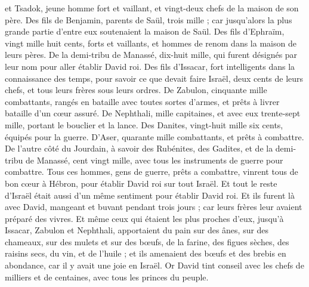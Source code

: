 \begin{multicols}{2}
et Tsadok, jeune homme fort et vaillant, et vingt-deux chefs de la maison de son père.
Des fils de Benjamin, parents de Saül, trois mille ; car jusqu'alors la plus grande partie d’entre eux soutenaient la maison de Saül.
Des fils d'Ephraïm, vingt mille huit cents, forts et vaillants, et hommes de renom dans la maison de leurs pères.
De la demi-tribu de Manassé, dix-huit mille, qui furent désignés par leur nom pour aller établir David roi.
Des fils d'Issacar, fort intelligents dans la connaissance des temps, pour savoir ce que devait faire Israël, deux cents de leurs chefs, et tous leurs frères sous leurs ordres.
De Zabulon, cinquante mille combattants, rangés en bataille avec toutes sortes d'armes, et prêts à livrer bataille d’un cœur assuré.
De Nephthali, mille capitaines, et avec eux trente-sept mille, portant le bouclier et la lance.
Des Danites, vingt-huit mille six cents, équipés pour la guerre.
D'Aser, quarante mille combattants, et prêts à combattre.
De l’autre côté du Jourdain, à savoir des Rubénites, des Gadites, et de la demi-tribu de Manassé, cent vingt mille, avec tous les instruments de guerre pour combattre.
Tous ces hommes, gens de guerre, prêts a combattre, vinrent tous de bon cœur à Hébron, pour établir David roi sur tout Israël. Et tout le reste d'Israël était aussi d'un même sentiment pour établir David roi.
Et ils furent là avec David, mangeant et buvant pendant trois jours ; car leurs frères leur avaient préparé des vivres.
Et même ceux qui étaient les plus proches d'eux, jusqu'à Issacar, Zabulon et Nephthali, apportaient du pain sur des ânes, sur des chameaux, sur des mulets et sur des bœufs, de la farine, des figues sèches, des raisins secs, du vin, et de l'huile ; et ils amenaient des bœufs et des brebis en abondance, car il y avait une joie en Israël.
\VerseOne{}Or David tint conseil avec les chefs de milliers et de centaines, avec tous les princes du peuple.

\end{multicols}
